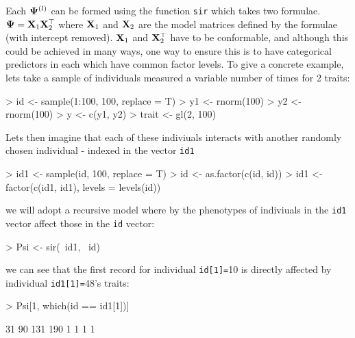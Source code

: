\documentclass{article}
\begin{document}
Each ${\bf \Psi}^{(l)}$ can be formed using the function \texttt{sir} which takes two formulae. ${\bf \Psi} = {\bf X}_{1}{\bf X}_{2}^{\top}$ where ${\bf X}_{1}$ and ${\bf X}_{2}$ are the model matrices defined by the formulae (with intercept removed).  ${\bf X}_{1}$ and ${\bf X}_{2}^{\top}$ have to be conformable, and although this could be achieved in many ways, one way to ensure this is to have categorical predictors in each which have common factor levels.  To give a concrete example, lets take a sample of individuals measured a variable number of times for 2 traits: 

\begin{Schunk}
\begin{Sinput}
> id <- sample(1:100, 100, replace = T)
> y1 <- rnorm(100)
> y2 <- rnorm(100)
> y <- c(y1, y2)
> trait <- gl(2, 100)
\end{Sinput}
\end{Schunk}


Lets then imagine that each of these indiviuals interacts with another randomly chosen individual - indexed in the vector \texttt{id1}

\begin{Schunk}
\begin{Sinput}
> id1 <- sample(id, 100, replace = T)
> id <- as.factor(c(id, id))
> id1 <- factor(c(id1, id1), levels = levels(id))
\end{Sinput}
\end{Schunk}

we will adopt a recursive model where by the phenotypes of indiviuals in the \texttt{id1} vector affect those in the \texttt{id} vector:

\begin{Schunk}
\begin{Sinput}
> Psi <- sir(~id1, ~id)
\end{Sinput}
\end{Schunk}

we can see that the first record for individual \texttt{id[1]=}10 is directly affected by individual \texttt{id1[1]=}48's traits:

\begin{Schunk}
\begin{Sinput}
> Psi[1, which(id == id1[1])]
\end{Sinput}
\begin{Soutput}
 31  90 131 190 
  1   1   1   1 
\end{Soutput}
\end{Schunk}
\end{document}
